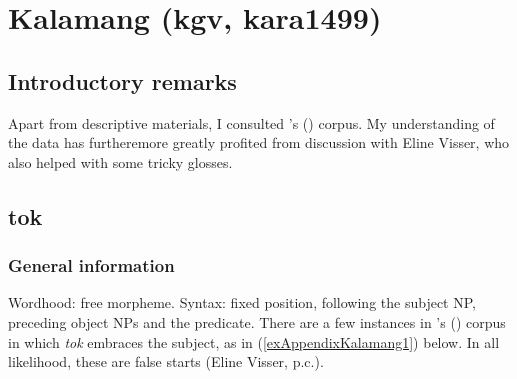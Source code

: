 \section{Kalamang (kgv, kara1499)}
\label{appendixKalamang}

\subsection{Introductory remarks}
Apart from descriptive materials, I consulted \citeauthor{Visser2021b}'s (\citeyear*{Visser2021b}) corpus. My understanding of the data has furtheremore greatly profited from discussion with Eline Visser, who also helped with some tricky glosses.
\subsection{tok}

\subsubsection{General information}
\begin{itemize}
	\ex Wordhood: free morpheme.
	\ex Syntax: fixed position,  following the subject NP, preceding object NPs and the predicate. There are a few instances in \citeauthor{Visser2021b}'s (\citeyear*{Visser2021b}) corpus in which \textit{tok} embraces the subject, as in (\ref{exAppendixKalamang1}) below. In all likelihood, these are false starts (Eline Visser, p.c.). 
\end{itemize}

